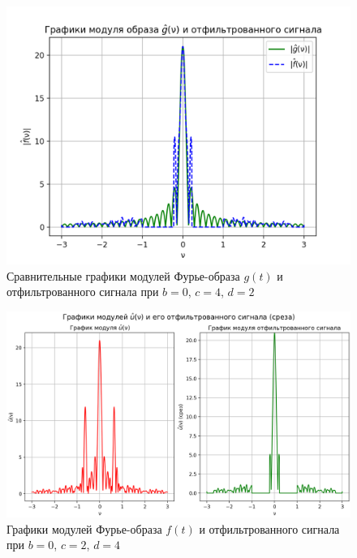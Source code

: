 \begin{figure}[ht!]
    \centering
    \includegraphics[scale=0.55]{media/1 task/specific_freq/Fourier_Image_Comparison_0_4_2_-1,0_-0,22_-2,99_-2,7.png}
    \caption{Сравнительные графики модулей Фурье-образа $g(t)$ и отфильтрованного сигнала при $b=0$,  $c=4$,  $d=2$}
    \label{fig:fourc_0_4_2}
\end{figure}

\clearpage

\begin{figure}[ht!]
    \centering
    \includegraphics[scale=0.55]{media/1 task/specific_freq/Fourier_Image_0_2_4_-1,0_-0,22_-2,99_-2,7.png}
    \caption{Графики модулей Фурье-образа $f(t)$ и отфильтрованного сигнала при $b=0$,  $c=2$,  $d=4$}
    \label{fig:four_0_2_4}
\end{figure}

